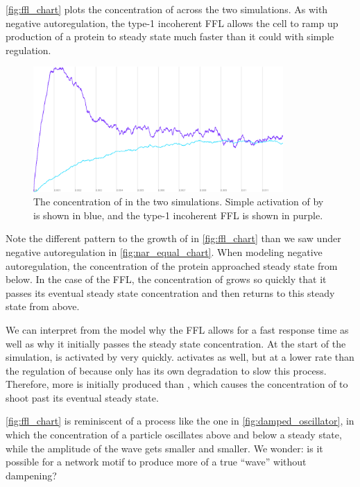 \autoref{fig:ffl_chart} plots the concentration of  across the two simulations. As with negative autoregulation, the type-1 incoherent FFL allows the cell to ramp up production of a protein  to steady state much faster than it could with simple regulation.\\

\begin{figure}[h]
\centering
\mySfFamily
\includegraphics[width = 0.85\textwidth]{../images/cellblender_ffl_white.png}
\caption{The concentration of  in the two simulations. Simple activation of  by  is shown in blue, and the type-1 incoherent FFL is shown in purple.}
\label{fig:ffl_chart}
\end{figure}

Note the different pattern to the growth of  in \autoref{fig:ffl_chart} than we saw under negative autoregulation in \autoref{fig:nar_equal_chart}. When modeling negative autoregulation, the concentration of the protein approached steady state from below. In the case of the FFL, the concentration of  grows so quickly that it passes its eventual steady state concentration and then returns to this steady state from above.

We can interpret from the model why the FFL allows for a fast response time as well as why it initially passes the steady state concentration. At the start of the simulation,  is activated by  very quickly.  activates  as well, but at a lower rate than the regulation of  because  only has its own degradation to slow this process. Therefore, more  is initially produced than , which causes the concentration of  to shoot past its eventual steady state.

\autoref{fig:ffl_chart} is reminiscent of a  process like the one in \autoref{fig:damped_oscillator}, in which the concentration of a particle oscillates above and below a steady state, while the amplitude of the wave gets smaller and smaller. We wonder: is it possible for a network motif to produce more of a true ``wave'' without dampening?\\

